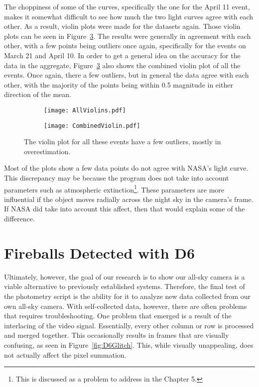 The choppiness of some of the curves, specifically the one for the April 11 event, makes it somewhat difficult to see how much the two light curves agree with each other. As a result, violin plots were made for the datasets again. Those violin plots can be seen in Figure~\ref{fig:twoviolin}. The results were generally in agreement with each other, with a few points being outliers once again, specifically for the events on March 21 and April 10. In order to get a general idea on the accuracy for the data in the aggregate, Figure~\ref{fig:twoviolin} also shows the combined violin plot of all the events. Once again, there a few outliers, but in general the data agree with each other, with the majority of the points being within 0.5 magnitude in either direction of the mean.

\begin{figure}[h!]
\centering
\begin{subfigure}{.5\textwidth}
	\centering
	\texttt{[image: AllViolins.pdf]}
	\label{fig:AllViolins}
\end{subfigure}%
\begin{subfigure}{.5\textwidth}
	\centering
	\texttt{[image: CombinedViolin.pdf]}
	\label{fig:CombinedViolin}
\end{subfigure}
\caption{The violin plot for all these events have a few outliers, mostly in overestimation.}
\label{fig:twoviolin}
\end{figure}

Most of the plots show a few data points do not agree with NASA's light curve. This discrepancy may be because the program does not take into account parameters such as atmospheric extinction\footnote{This is discussed as a problem to address in the Chapter 5.}. These parameters are more influential if the object moves radially across the night sky in the camera's frame. If NASA did take into account this affect, then that would explain some of the difference. 


\section{Fireballs Detected with D6}

Ultimately, however, the goal of our research is to show our all-sky camera is a viable alternative to previously established systems. Therefore, the final test of the photometry script is the ability for it to analyze new data collected from our own all-sky camera. With self-collected data, however, there are often problems that requires troubleshooting. One problem that emerged is a result of the interlacing of the video signal. Essentially, every other column or row is processed and merged together. This occasionally results in frames that are visually confusing, as seen in Figure~\ref{fig:D6Glitch}. This, while visually unappealing, does not actually affect the pixel summation.

